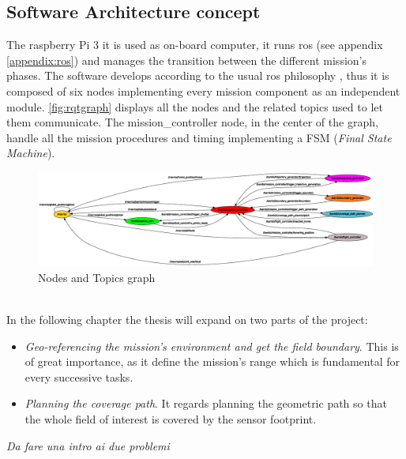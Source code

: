  \subsection{Software Architecture concept} %
 \label{sub:software_design}
 The raspberry Pi 3 it is used as on-board computer, it runs \acrshort{ros} (see appendix \ref{appendix:ros}) and manages the transition between the different mission's phases. The software develops according to the usual \acrshort{ros} philosophy \cite{288}, thus it is composed of six nodes implementing every mission component as an independent module. \autoref{fig:rqtgraph} displays all the nodes and the related topics used to let them communicate. The \textsf{mission\_controller} node, in the center of the graph, handle all the mission procedures and timing implementing a FSM (\textit{Final State Machine}).
\begin{figure}[ht]
    \centering
    \includegraphics[width=1.4\textwidth, angle=270]{figures/C1/rqtgraph.eps}
    \caption{Nodes and Topics graph}
    \label{fig:rqtgraph}
\end{figure}\\
 In the following chapter the thesis will expand on two parts of the project:
 \begin{itemize}
  	\item \textit{Geo-referencing the mission's environment and get the field boundary}. This is of great importance, as it define the mission's range which is fundamental for every successive tasks.
  	\item \textit{Planning the coverage path}. It regards planning the geometric path so that the whole field of interest is covered by the sensor footprint.

  \end{itemize}


\textit{Da fare una intro ai due problemi}

